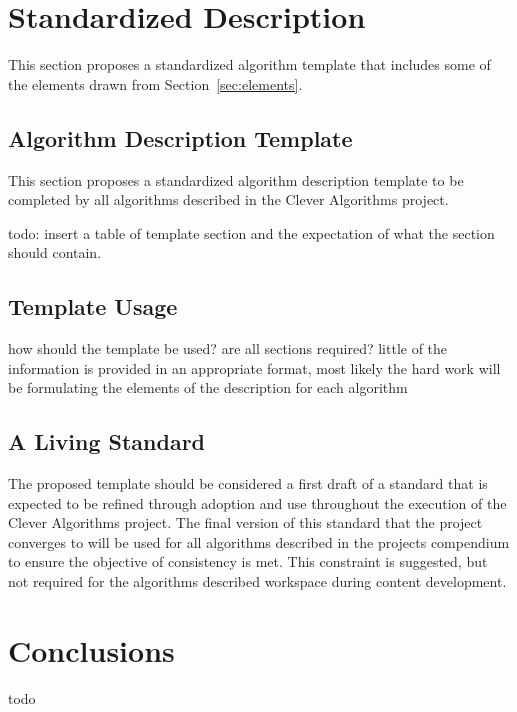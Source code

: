 \documentclass[a4paper, 11pt]{article}
\begin{document}
\section{Standardized Description} 
\label{sec:template}
This section proposes a standardized algorithm template that includes some of the elements drawn from Section~\ref{sec:elements}. 

\subsection{Algorithm Description Template}
This section proposes a standardized algorithm description template to be completed by all algorithms described in the Clever Algorithms project.

todo: insert a table of template section and the expectation of what the section should contain.

\subsection{Template Usage}
how should the template be used? are all sections required? little of the information is provided in an appropriate format, most likely the hard work will be formulating the elements of the description for each algorithm

\subsection{A Living Standard}
The proposed template should be considered a first draft of a standard that is expected to be refined through adoption and use throughout the execution of the Clever Algorithms project. The final version of this standard that the project converges to will be used for all algorithms described in the projects compendium to ensure the objective of consistency is met. This constraint is suggested, but not required for the algorithms described workspace during content development.

\section{Conclusions}
\label{sec:conclusions}
todo



\end{document}
